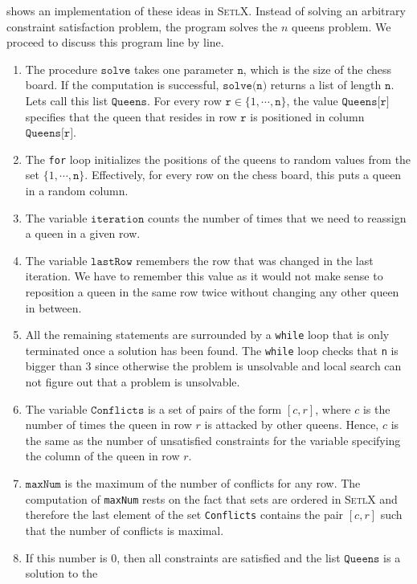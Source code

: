 \noindent
{} shows an implementation of these ideas in \textsc{SetlX}.  Instead of solving an
arbitrary constraint satisfaction problem, the program solves the $n$ queens problem.  We proceed to discuss
this program line by line.
\begin{enumerate}
\item The procedure $\texttt{solve}$ takes one parameter $\texttt{n}$, which is the size of the chess board.  If
      the computation is successful, $\texttt{solve(n)}$ returns a list of length $\texttt{n}$.  Lets call this
      list $\texttt{Queens}$. For every row $\texttt{r} \in \{1, \cdots, \texttt{n}\}$, the value $\texttt{Queens[r]}$ specifies that the queen 
      that resides in row $\texttt{r}$ is positioned in column $\texttt{Queens[r]}$.
\item The \texttt{for} loop initializes the positions of the queens to random values from the set
      $\{1, \cdots, \texttt{n}\}$.  Effectively, for every row on the chess board, this puts a queen in a
      random column.
\item The variable $\texttt{iteration}$ counts the number of times that we need to reassign a queen in a given
      row.
\item The variable $\texttt{lastRow}$ remembers the row that was changed in the last iteration.
      We have to remember this value as it would not make sense to reposition a queen in the same row twice
      without changing any other queen in between.
\item All the remaining statements are surrounded by a \texttt{while} loop that is only terminated once a
      solution has been found.  The \texttt{while} loop checks that \texttt{n} is bigger than $3$ since
      otherwise the problem is unsolvable and local search can not figure out that a problem is unsolvable.
\item The variable $\texttt{Conflicts}$ is a set of pairs of the form $[c, r]$, where $c$ is the number of
      times the queen in row $r$ is attacked by other queens.  Hence, $c$ is the same as the number of
      unsatisfied constraints for the variable specifying the column of the queen in row $r$.
\item $\texttt{maxNum}$ is the maximum of the number of conflicts for any row.  The computation of
      \texttt{maxNum} rests on the fact that sets are ordered in \textsc{SetlX} and therefore the last element
      of the set \texttt{Conflicts} contains the pair $[c, r]$ such that the number of conflicts is maximal. 
\item If this number is $0$, then all constraints are satisfied and the list $\texttt{Queens}$ is a solution to the

\end{enumerate}
